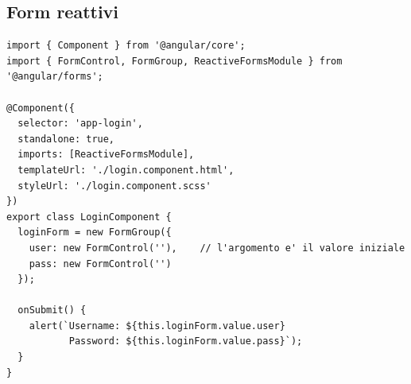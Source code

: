 \subsection{Form reattivi}

\begin{lstlisting}[style=ts, name=login.component.ts]
import { Component } from '@angular/core';
import { FormControl, FormGroup, ReactiveFormsModule } from '@angular/forms';

@Component({
  selector: 'app-login',
  standalone: true,
  imports: [ReactiveFormsModule],
  templateUrl: './login.component.html',
  styleUrl: './login.component.scss'
})
export class LoginComponent {
  loginForm = new FormGroup({
    user: new FormControl(''),    // l'argomento e' il valore iniziale
    pass: new FormControl('')
  });

  onSubmit() {
    alert(`Username: ${this.loginForm.value.user}
           Password: ${this.loginForm.value.pass}`);
  }
}
\end{lstlisting}

